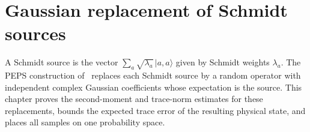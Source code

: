 \chapter{Gaussian replacement of Schmidt sources}
\label{ch:gaussian_sources}

A Schmidt source is the vector $\sum_a\sqrt{\lambda_a}\,|a,a\rangle$ given by
Schmidt weights $\lambda_a$. The PEPS construction
of~\cite[Theorem~5.2]{OpenAI2026PolynomialPEPS} replaces each Schmidt source by
a random operator with independent complex Gaussian coefficients whose
expectation is the source. This chapter proves the second-moment and trace-norm
estimates for these replacements, bounds the expected trace error of the
resulting physical state, and places all samples on one probability space.






